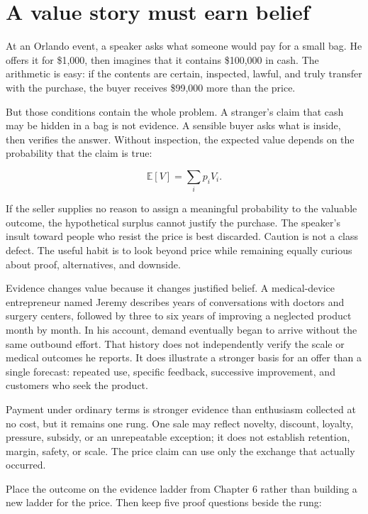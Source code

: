 \section{A value story must earn belief}

At an Orlando event, a speaker asks what someone would pay for a small bag. He
offers it for \$1,000, then imagines that it contains \$100,000 in cash. The
arithmetic is easy: if the contents are certain, inspected, lawful, and truly
transfer with the purchase, the buyer receives \$99,000 more than the price.

But those conditions contain the whole problem. A stranger's claim that cash
may be hidden in a bag is not evidence. A sensible buyer asks what is inside,
then verifies the answer. Without inspection, the expected value depends on
the probability that the claim is true:

\begin{equation}
\mathbb{E}[V]=\sum_i p_i V_i.
\end{equation}

If the seller supplies no reason to assign a meaningful probability to the
valuable outcome, the hypothetical surplus cannot justify the purchase. The
speaker's insult toward people who resist the price is best discarded. Caution
is not a class defect. The useful habit is to look beyond price while remaining
equally curious about proof, alternatives, and downside.

Evidence changes value because it changes justified belief. A medical-device
entrepreneur named Jeremy describes years of conversations with doctors and
surgery centers, followed by three to six years of improving a neglected
product month by month. In his account, demand eventually began to arrive
without the same outbound effort. That history does not independently verify
the scale or medical outcomes he reports. It does illustrate a stronger basis
for an offer than a single forecast: repeated use, specific feedback,
successive improvement, and customers who seek the product.

Payment under ordinary terms is stronger evidence than enthusiasm collected at
no cost, but it remains one rung. One sale may reflect novelty, discount,
loyalty, pressure, subsidy, or an unrepeatable exception; it does not establish
retention, margin, safety, or scale. The price claim can use only the exchange
that actually occurred.

Place the outcome on the evidence ladder from Chapter 6 rather than building a
new ladder for the price. Then keep five proof questions beside the rung:

